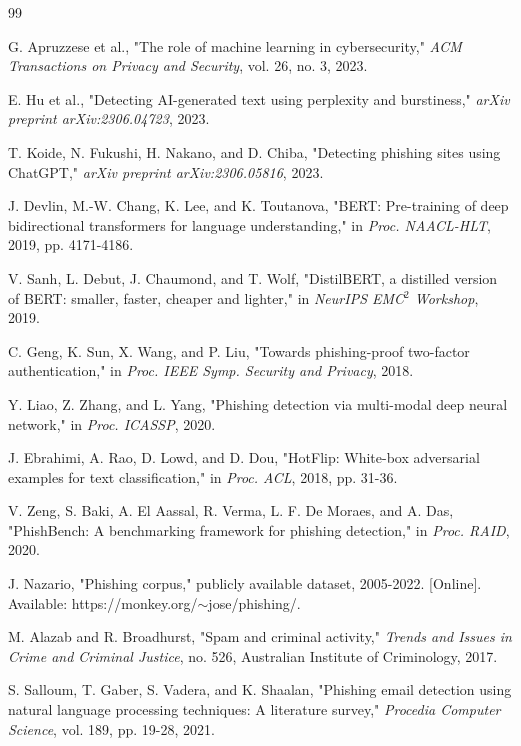 \documentclass[pdflatex,sn-mathphys-num]{sn-jnl}
\begin{document}
\begin{thebibliography}{99}

 G. Apruzzese et al., "The role of machine learning in cybersecurity," \textit{ACM Transactions on Privacy and Security}, vol. 26, no. 3, 2023.

 E. Hu et al., "Detecting AI-generated text using perplexity and burstiness," \textit{arXiv preprint arXiv:2306.04723}, 2023.

 T. Koide, N. Fukushi, H. Nakano, and D. Chiba, "Detecting phishing sites using ChatGPT," \textit{arXiv preprint arXiv:2306.05816}, 2023.

 J. Devlin, M.-W. Chang, K. Lee, and K. Toutanova, "BERT: Pre-training of deep bidirectional transformers for language understanding," in \textit{Proc. NAACL-HLT}, 2019, pp. 4171-4186.

 V. Sanh, L. Debut, J. Chaumond, and T. Wolf, "DistilBERT, a distilled version of BERT: smaller, faster, cheaper and lighter," in \textit{NeurIPS EMC$^2$ Workshop}, 2019.

 C. Geng, K. Sun, X. Wang, and P. Liu, "Towards phishing-proof two-factor authentication," in \textit{Proc. IEEE Symp. Security and Privacy}, 2018.

 Y. Liao, Z. Zhang, and L. Yang, "Phishing detection via multi-modal deep neural network," in \textit{Proc. ICASSP}, 2020.

 J. Ebrahimi, A. Rao, D. Lowd, and D. Dou, "HotFlip: White-box adversarial examples for text classification," in \textit{Proc. ACL}, 2018, pp. 31-36.

 V. Zeng, S. Baki, A. El Aassal, R. Verma, L. F. De Moraes, and A. Das, "PhishBench: A benchmarking framework for phishing detection," in \textit{Proc. RAID}, 2020.

 J. Nazario, "Phishing corpus," publicly available dataset, 2005-2022. [Online]. Available: https://monkey.org/$\sim$jose/phishing/.

 M. Alazab and R. Broadhurst, "Spam and criminal activity," \textit{Trends and Issues in Crime and Criminal Justice}, no. 526, Australian Institute of Criminology, 2017.

 S. Salloum, T. Gaber, S. Vadera, and K. Shaalan, "Phishing email detection using natural language processing techniques: A literature survey," \textit{Procedia Computer Science}, vol. 189, pp. 19-28, 2021.

\end{thebibliography}
\end{document}
